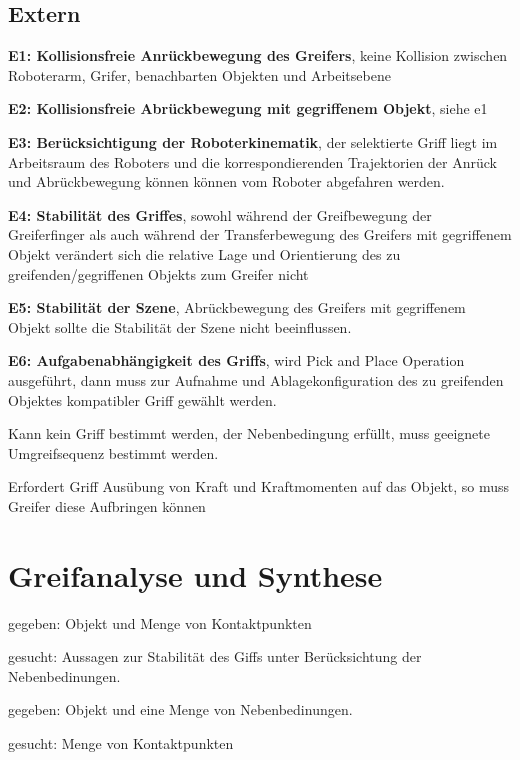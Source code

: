\subsection{Extern}
\begin{compactitem}
    \item \textbf{E1: Kollisionsfreie Anrückbewegung des Greifers}, keine Kollision zwischen Roboterarm,
    Grifer, benachbarten Objekten und Arbeitsebene
    \item \textbf{E2: Kollisionsfreie Abrückbewegung mit gegriffenem Objekt}, siehe e1
    \item \textbf{E3: Berücksichtigung der Roboterkinematik}, der selektierte Griff liegt im Arbeitsraum
    des Roboters und die korrespondierenden Trajektorien der Anrück und Abrückbewegung können
    können vom Roboter abgefahren werden.
    \item \textbf{E4: Stabilität des Griffes}, sowohl während der Greifbewegung der Greiferfinger als
    auch während der Transferbewegung des Greifers mit gegriffenem Objekt verändert sich die relative
    Lage und Orientierung des zu greifenden/gegriffenen Objekts zum Greifer nicht
    \item \textbf{E5: Stabilität der Szene}, Abrückbewegung des Greifers mit gegriffenem Objekt sollte
    die Stabilität der Szene nicht beeinflussen.
    \item \textbf{E6: Aufgabenabhängigkeit des Griffs}, wird Pick and Place Operation ausgeführt, dann
    muss zur Aufnahme und Ablagekonfiguration des zu greifenden Objektes kompatibler Griff gewählt werden.
    \begin{compactitem}
        \item Kann kein Griff bestimmt werden, der Nebenbedingung erfüllt, muss geeignete Umgreifsequenz
        bestimmt werden.
        \item Erfordert Griff Ausübung von Kraft und Kraftmomenten auf das Objekt, so muss Greifer diese
        Aufbringen können
    \end{compactitem}
\end{compactitem}

\section{Greifanalyse und Synthese}
\begin{compactitem}
    \item gegeben: Objekt und Menge von Kontaktpunkten
    \item gesucht: Aussagen zur Stabilität des Giffs unter Berücksichtung der Nebenbedinungen.
\end{compactitem}
\begin{compactitem}
    \item gegeben: Objekt und eine Menge von Nebenbedinungen.
    \item gesucht: Menge von Kontaktpunkten
\end{compactitem}

